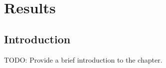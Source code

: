 \chapter{Results}
\label{sec:results}

\section{Introduction}
TODO: Provide a brief introduction to the chapter.


